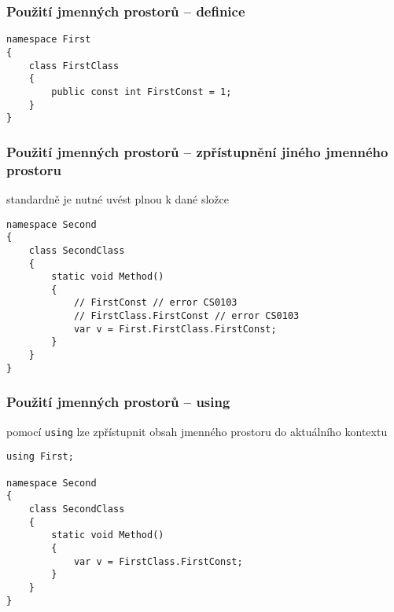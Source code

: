 \begin{frame}[fragile]
\frametitle{Použití jmenných prostorů -- definice}

\begin{yesblock}
\begin{lstlisting}
namespace First
{
    class FirstClass
    {
        public const int FirstConst = 1;
    }
}
\end{lstlisting}
\end{yesblock}
\end{frame}




\begin{frame}[fragile]
\frametitle{Použití jmenných prostorů -- zpřístupnění jiného jmenného prostoru}
\vfill
\begin{bitemize}{}
\item standardně je nutné uvést plnou  k dané složce
\end{bitemize}
\vfill
\begin{yesblock}
\begin{lstlisting}
namespace Second
{
    class SecondClass
    {
        static void Method()
        {
            // FirstConst // error CS0103
            // FirstClass.FirstConst // error CS0103
            var v = First.FirstClass.FirstConst;
        }
    }
}
\end{lstlisting}
\end{yesblock}
\vfill
\end{frame}




\begin{frame}[fragile]
\frametitle{Použití jmenných prostorů -- using}
\vfill
\begin{bitemize}{}
\item pomocí \lstinline|using| lze zpřístupnit obsah jmenného prostoru do aktuálního kontextu
\end{bitemize}
\vfill
\begin{yesblock}
\begin{lstlisting}
using First;

namespace Second
{
    class SecondClass
    {
        static void Method()
        {
            var v = FirstClass.FirstConst;
        }
    }
}
\end{lstlisting}
\end{yesblock}
\vfill
\end{frame}






